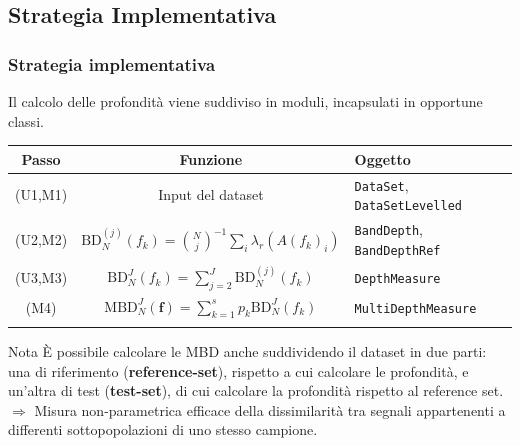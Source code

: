 \documentclass[9pt]{beamer}
\begin{document}
\subsection{Strategia Implementativa}
\begin{frame}
 \frametitle{Strategia implementativa}

Il calcolo delle profondit\`a viene suddiviso in moduli, incapsulati in opportune classi.\\
\medskip

 \begin{tabular}{c c l}
\toprule
 \textbf{Passo} & \textbf{Funzione} & \textbf{Oggetto}\\
\midrule
\bigskip
 (U1,M1) & Input del dataset & \texttt{DataSet}, \texttt{DataSetLevelled}\\
\bigskip
 (U2,M2) & $\text{BD}^{(j)}_N(f_k) = {N \choose j}^{-1} \sum_{i} \lambda_r \left( A(f_k)_i \right)$ & \texttt{BandDepth}, \texttt{BandDepthRef}\\
\bigskip
 (U3,M3) & $\text{BD}^J_N\left( f_k \right) = \sum_{j=2}^J \text{BD}^{(j)}_N\left(f_k \right) $ & \texttt{DepthMeasure}\\ 
(M4) & $\text{MBD}^J_N\left( \mathbf{f} \right) = \sum_{k=1}^s p_k \text{BD}^{J}_N   \left(f_{k}\right)$ & \texttt{MultiDepthMeasure}\\
\bottomrule 
\smallskip
\end{tabular}

\pause
\begin{block}{Nota}
\`E possibile calcolare le MBD anche suddividendo il dataset in due parti: una di riferimento (\textbf{reference-set}), rispetto a cui 
calcolare le profondità, e un’altra di test (\textbf{test-set}), di cui calcolare la profondità rispetto al reference set.\\
\medskip
$\Longrightarrow$   Misura non-parametrica efficace della dissimilarità tra segnali appartenenti a differenti sottopopolazioni di uno stesso campione.
\end{block}


\end{frame}


\end{document}
